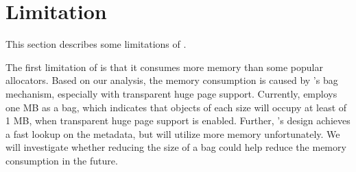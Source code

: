 \section{Limitation}
\label{sec:limit}

This section describes some limitations of \NM{}. 

The first limitation of \NM{} is that it consumes more memory than some popular allocators. Based on our analysis, the memory consumption is caused by \NM{}'s bag mechanism, especially with transparent huge page support. Currently, \NM{} employs one MB as a bag, which indicates that objects of each size will occupy at least of 1 MB, when transparent huge page support is enabled. Further, \NM{}'s design achieves a fast lookup on the metadata, but will utilize more memory unfortunately. We will investigate whether reducing the size of a bag could help reduce the memory consumption in the future.

